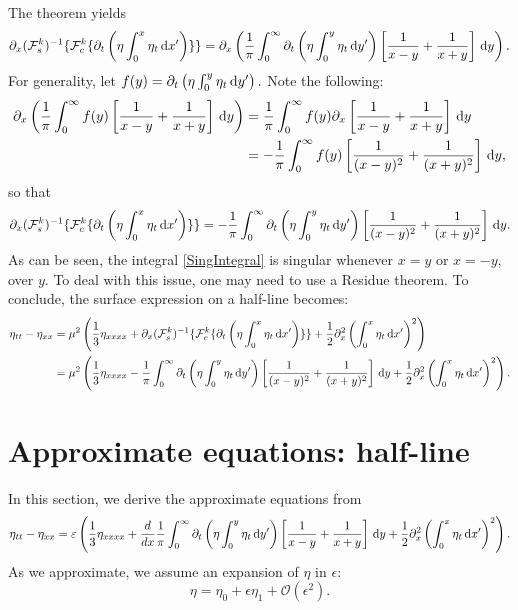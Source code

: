 \documentclass[10pt,reqno,oneside,a4paper, landscape]{article}
\begin{document}
The theorem yields 
\[ \partial_x(\mathcal{F}^k_s)^{-1} \{ \mathcal{F}^k_c \{ \partial_t \left( \eta \int^{x}_0\eta_{t} \,\mathrm{d} x' \right)\} \}
= \partial_x \left( \frac{1}{\pi} \int_0^\infty \partial_t \left( \eta \int^{y}_0\eta_{t} \,\mathrm{d} y' \right)  \left[ \frac{1}{x-y} + \frac{1}{x+y} \right] \,\mathrm{d} y \right). \]
For generality, let $f(y) = \partial_t \left( \eta \int^{y}_0\eta_{t} \,\mathrm{d} y' \right).$ Note the following:
\begin{align*} 
\partial_x \left( \frac{1}{\pi} \int_0^\infty f(y) \left[ \frac{1}{x-y} + \frac{1}{x+y} \right] \,\mathrm{d} y \right) &= \frac{1}{\pi} \int_0^\infty f(y) \partial_x \left[ \frac{1}{x-y} + \frac{1}{x+y} \right] \,\mathrm{d} y \\
&= - \frac{1}{\pi} \int_0^\infty f(y)  \left[ \frac{1}{(x-y)^2} + \frac{1}{(x+y)^2} \right] \,\mathrm{d} y,
\end{align*}
so that
\begin{equation}\label{SingIntegral}
\partial_x(\mathcal{F}^k_s)^{-1} \{ \mathcal{F}^k_c \{ \partial_t \left( \eta \int^{x}_0\eta_{t} \,\mathrm{d} x' \right)\} \} = - \frac{1}{\pi} \int_0^\infty \partial_t \left( \eta \int^{y}_0\eta_{t} \,\mathrm{d} y' \right) \left[ \frac{1}{(x-y)^2} + \frac{1}{(x+y)^2} \right] \,\mathrm{d} y.
\end{equation}
As can be seen, the integral \eqref{SingIntegral} is singular whenever $x = y$ or $x = -y,$ over $y.$ To deal with this issue, one may need to use a Residue theorem. To conclude, the surface expression on a half-line becomes:
\begin{align*}
 \eta_{tt} - \eta_{xx} &= \mu^2 \left( \frac{1}{3} \eta_{xxxx}  + \partial_x(\mathcal{F}^k_s)^{-1} \{ \mathcal{F}^k_c \{ \partial_t \left( \eta \int^{x}_0\eta_{t} \,\mathrm{d} x' \right)\} \} + \frac{1}{2} \partial^2_x\left(\int^{x}_0\eta_{t} \,\mathrm{d} x' \right)^2\right) \\
 &= \mu^2 \left( \frac{1}{3} \eta_{xxxx}  - \frac{1}{\pi} \int_0^\infty \partial_t \left( \eta \int^{y}_0\eta_{t} \,\mathrm{d} y' \right) \left[ \frac{1}{(x-y)^2} + \frac{1}{(x+y)^2} \right] \,\mathrm{d} y + \frac{1}{2} \partial^2_x\left(\int^{x}_0\eta_{t} \,\mathrm{d} x' \right)^2\right) . 
\end{align*}

\section{Approximate equations: half-line}
In this section, we derive the approximate equations from
\begin{equation}\label{srfceq0}
\eta_{tt} - \eta_{xx} = \varepsilon \left( \frac{1}{3} \eta_{xxxx}  + \frac{d}{dx} \frac{1}{\pi} \int_0^\infty \partial_t \left( \eta \int^{y}_0\eta_{t} \,\mathrm{d} y' \right) \left[ \frac{1}{x-y} + \frac{1}{x+y} \right] \,\mathrm{d} y + \frac{1}{2} \partial^2_x\left(\int^{x}_0\eta_{t} \,\mathrm{d} x' \right)^2\right). 
\end{equation}
As we approximate, we assume an expansion of $\eta$ in $\epsilon:$
\begin{equation}\label{SrfcExpansion}
\eta = \eta_0 + \epsilon \eta_1 + \mathcal{O}(\epsilon^2).
\end{equation}
\end{document}
